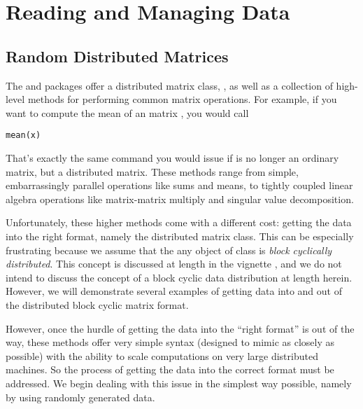 \part{Reading and Managing Data}
\label{part:dmat}


\chapter{Random Distributed Matrices}
\label{sec:reader}

The  and  packages offer a distributed matrix class, , as well as a collection of high-level methods for performing common matrix operations.  For example, if you want to compute the mean of an  matrix , you would call 
\begin{lstlisting}[language=rr]
mean(x)
\end{lstlisting}
That's exactly the same command you would issue if  is no longer an ordinary  matrix, but a distributed matrix.  These methods range from simple, embarrassingly parallel operations like sums and means, to tightly coupled linear algebra operations like matrix-matrix multiply and singular value decomposition.

Unfortunately, these higher methods come with a different cost:  getting the data into the right format, namely the distributed matrix class.  This can be especially frustrating because we assume that the any object of class  is \emph{block cyclically distributed}.  This concept is discussed at length in the  vignette \citep{Schmidt2012pbdBASEvignette}, and we do not intend to discuss the concept of a block cyclic data distribution at length herein.  However, we will demonstrate several examples of getting data into and out of the distributed block cyclic matrix format.

However, once the hurdle of getting the data into the ``right format'' is out of the way, these methods offer very simple syntax (designed to mimic  as closely as possible) with the ability to scale computations on very large distributed machines.  So the process of getting the data into the correct format must be addressed.  We begin dealing with this issue in the simplest way possible, namely by using randomly generated data.  

